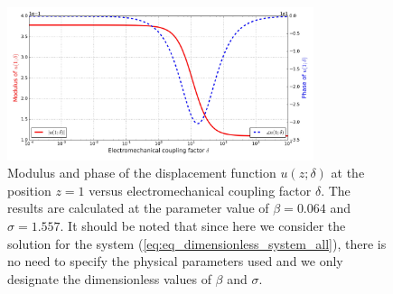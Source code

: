 \documentclass{svjour3}                     %
\begin{document}
\begin{figure}[!htbp]
    \centering
    \includegraphics[width=0.8\textwidth]{./img_eig_asy/fig_sol_analytic_disp_end.jpg}
    \caption{Modulus and phase of the displacement function $u(z;\delta)$ at the position $z=1$ versus electromechanical coupling factor $\delta$. The results are calculated at the parameter value of $\beta = 0.064$ and $\sigma = 1.557$. It should be noted that since here we consider the solution for the system (\ref{eq:eq_dimensionless_system_all}), there is no need to specify the physical parameters used and we only designate the dimensionless values of $\beta $ and $\sigma $.}
    \label{fig:fig_sol_analytic_disp_end}
\end{figure}
\end{document}
